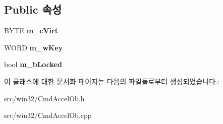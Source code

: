 \subsection*{Public 속성}
\begin{DoxyCompactItemize}
\item 
\mbox{\label{class_c_accels_ob_a08b7003ccf92c6afcf31878960d8eee1}} 
B\+Y\+TE {\bfseries m\+\_\+c\+Virt}
\item 
\mbox{\label{class_c_accels_ob_a1891250e9a4d00c0862f3a90a965d635}} 
W\+O\+RD {\bfseries m\+\_\+w\+Key}
\item 
\mbox{\label{class_c_accels_ob_ad8300bd20bd429ad61f89700e388dd9a}} 
bool {\bfseries m\+\_\+b\+Locked}
\end{DoxyCompactItemize}


이 클래스에 대한 문서화 페이지는 다음의 파일들로부터 생성되었습니다.\+:\begin{DoxyCompactItemize}
\item 
src/win32/Cmd\+Accel\+Ob.\+h\item 
src/win32/Cmd\+Accel\+Ob.\+cpp\end{DoxyCompactItemize}
